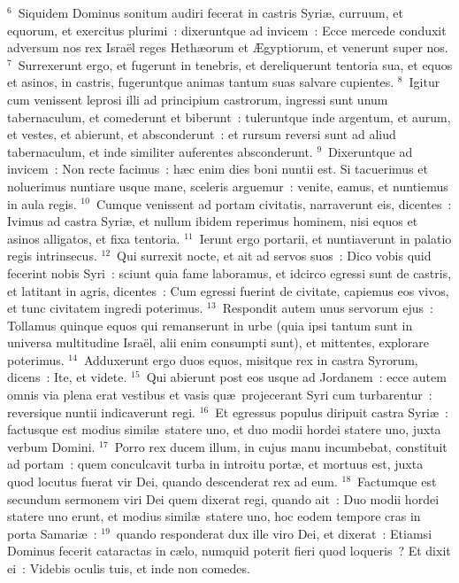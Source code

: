 ${}^{6}$~Siquidem Dominus sonitum audiri fecerat in castris Syri\ae , curruum, et equorum, et exercitus plurimi~: dixeruntque ad invicem~: Ecce mercede conduxit adversum nos rex Isra\"el reges Heth\ae orum et \AE gyptiorum, et venerunt super nos.
${}^{7}$~Surrexerunt ergo, et fugerunt in tenebris, et dereliquerunt tentoria sua, et equos et asinos, in castris, fugeruntque animas tantum suas salvare cupientes.
${}^{8}$~Igitur cum venissent leprosi illi ad principium castrorum, ingressi sunt unum tabernaculum, et comederunt et biberunt~: tuleruntque inde argentum, et aurum, et vestes, et abierunt, et absconderunt~: et rursum reversi sunt ad aliud tabernaculum, et inde similiter auferentes absconderunt.
${}^{9}$~Dixeruntque ad invicem~: Non recte facimus~: h\ae c enim dies boni nuntii est. Si tacuerimus et noluerimus nuntiare usque mane, sceleris arguemur~: venite, eamus, et nuntiemus in aula regis.
${}^{10}$~Cumque venissent ad portam civitatis, narraverunt eis, dicentes~: Ivimus ad castra Syri\ae , et nullum ibidem reperimus hominem, nisi equos et asinos alligatos, et fixa tentoria.
${}^{11}$~Ierunt ergo portarii, et nuntiaverunt in palatio regis intrinsecus.
${}^{12}$~Qui surrexit nocte, et ait ad servos suos~: Dico vobis quid fecerint nobis Syri~: sciunt quia fame laboramus, et idcirco egressi sunt de castris, et latitant in agris, dicentes~: Cum egressi fuerint de civitate, capiemus eos vivos, et tunc civitatem ingredi poterimus.
${}^{13}$~Respondit autem unus servorum ejus~: Tollamus quinque equos qui remanserunt in urbe (quia ipsi tantum sunt in universa multitudine Isra\"el, alii enim consumpti sunt), et mittentes, explorare poterimus.
${}^{14}$~Adduxerunt ergo duos equos, misitque rex in castra Syrorum, dicens~: Ite, et videte.
${}^{15}$~Qui abierunt post eos usque ad Jordanem~: ecce autem omnis via plena erat vestibus et vasis qu\ae\ projecerant Syri cum turbarentur~: reversique nuntii indicaverunt regi.
${}^{16}$~Et egressus populus diripuit castra Syri\ae~: factusque est modius simil\ae\ statere uno, et duo modii hordei statere uno, juxta verbum Domini.
${}^{17}$~Porro rex ducem illum, in cujus manu incumbebat, constituit ad portam~: quem conculcavit turba in introitu port\ae , et mortuus est, juxta quod locutus fuerat vir Dei, quando descenderat rex ad eum.
${}^{18}$~Factumque est secundum sermonem viri Dei quem dixerat regi, quando ait~: Duo modii hordei statere uno erunt, et modius simil\ae\ statere uno, hoc eodem tempore cras in porta Samari\ae~:
${}^{19}$~quando responderat dux ille viro Dei, et dixerat~: Etiamsi Dominus fecerit cataractas in c\ae lo, numquid poterit fieri quod loqueris~? Et dixit ei~: Videbis oculis tuis, et inde non comedes.
